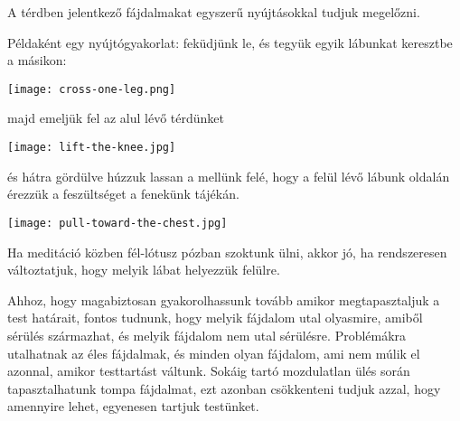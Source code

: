 \documentclass[10pt,oneside,landscape,final]{memoir}
\begin{document}
A térdben jelentkező fájdalmakat egyszerű nyújtásokkal tudjuk megelőzni.

Példaként egy nyújtógyakorlat: feküdjünk le, és tegyük egyik lábunkat keresztbe
a másikon:

{\centering\par
\texttt{[image: cross-one-leg.png]}%
\par}

majd emeljük fel az alul lévő térdünket

{\centering\par
\texttt{[image: lift-the-knee.jpg]}%
\par}

és hátra gördülve húzzuk lassan a mellünk felé, hogy a felül lévő lábunk oldalán
érezzük a feszültséget a fenekünk tájékán.

{\centering\par
\texttt{[image: pull-toward-the-chest.jpg]}%
\par}

Ha meditáció közben fél-lótusz pózban szoktunk ülni, akkor jó, ha rendszeresen
változtatjuk, hogy melyik lábat helyezzük felülre.

Ahhoz, hogy magabiztosan gyakorolhassunk tovább amikor megtapasztaljuk a test
határait, fontos tudnunk, hogy melyik fájdalom utal olyasmire, amiből sérülés
származhat, és melyik fájdalom nem utal sérülésre. Problémákra utalhatnak az
éles fájdalmak, és minden olyan fájdalom, ami nem múlik el azonnal, amikor
testtartást váltunk. Sokáig tartó mozdulatlan ülés során tapasztalhatunk tompa
fájdalmat, ezt azonban csökkenteni tudjuk azzal, hogy amennyire lehet, egyenesen
tartjuk testünket.
\end{document}
